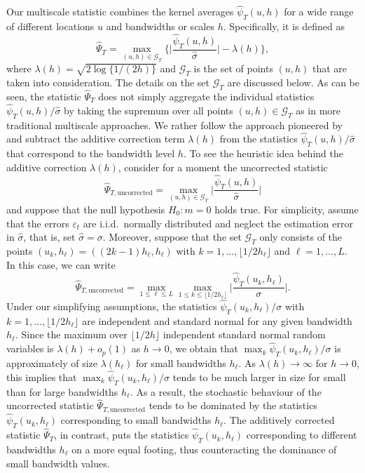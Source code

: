 Our multiscale statistic combines the kernel averages $\widehat{\psi}_T(u,h)$ for a wide range of different locations $u$ and bandwidths or scales $h$. Specifically, it is defined as
\begin{equation}\label{multiscale-stat}
\widehat{\Psi}_T = \max_{(u,h) \in \mathcal{G}_T} \Big\{ \Big|\frac{\widehat{\psi}_T(u,h)}{\widehat{\sigma}}\Big| - \lambda(h) \Big\}, 
\end{equation} 
where $\lambda(h) = \sqrt{2 \log \{ 1/(2h) \}}$ and $\mathcal{G}_T$ is the set of points $(u,h)$ that are taken into consideration. The details on the set $\mathcal{G}_T$ are discussed below. As can be seen, the statistic $\widehat{\Psi}_T$ does not simply aggregate the individual statistics $\widehat{\psi}_T(u,h)/\widehat{\sigma}$ by taking the supremum over all points $(u,h) \in \mathcal{G}_T$ as in more traditional multiscale approaches. We rather follow the approach pioneered by \cite{DuembgenSpokoiny2001} and subtract the additive correction term $\lambda(h)$ from the statistics $\widehat{\psi}_T(u,h)/\widehat{\sigma}$ that correspond to the bandwidth level $h$. To see the heuristic idea behind the additive correction $\lambda(h)$, consider for a moment the uncorrected statistic
\[ \widehat{\Psi}_{T,\text{uncorrected}} = \max_{(u,h) \in \mathcal{G}_T} \Big|\frac{\widehat{\psi}_T(u,h)}{\widehat{\sigma}}\Big| \]
and suppose that the null hypothesis $H_0: m = 0$ holds true. For simplicity, assume that the errors $\varepsilon_t$ are i.i.d.\ normally distributed and neglect the estimation error in $\widehat{\sigma}$, that is, set $\widehat{\sigma} = \sigma$. Moreover, suppose that the set $\mathcal{G}_T$ only consists of the points $(u_k,h_\ell) = ((2k - 1)h_\ell,h_\ell)$ with $k = 1,\ldots,\lfloor 1/2h_\ell \rfloor$ and $\ell = 1,\ldots,L$. In this case, we can write
\[ \widehat{\Psi}_{T,\text{uncorrected}} = \max_{1 \le \ell \le L} \max_{1 \le k \le \lfloor 1/2h_\ell \rfloor} \Big|\frac{\widehat{\psi}_T(u_k,h_\ell)}{\sigma}\Big|. \]
Under our simplifying assumptions, the statistics $\widehat{\psi}_T(u_k,h_\ell)/\sigma$ with $k = 1,\ldots,\lfloor 1/2h_\ell \rfloor$ are independent and standard normal for any given bandwidth $h_\ell$. Since the maximum over $\lfloor 1/2h \rfloor$ independent standard normal random variables is $\lambda(h) + o_p(1)$ as $h \rightarrow 0$, we obtain that $\max_{k} \widehat{\psi}_T(u_k,h_\ell)/\sigma$ is approximately of size $\lambda(h_\ell)$ for small bandwidths $h_\ell$. As $\lambda(h) \rightarrow \infty$ for $h \rightarrow 0$, this implies that $\max_{k} \widehat{\psi}_T(u_k,h_\ell)/\sigma$ tends to be much larger in size for small than for large bandwidths $h_\ell$. As a result, the stochastic behaviour of the uncorrected statistic $\widehat{\Psi}_{T,\text{uncorrected}}$ tends to be dominated by the statistics $\widehat{\psi}_T(u_k,h_\ell)$ corresponding to small bandwidths $h_\ell$. The additively corrected statistic $\widehat{\Psi}_T$, in contrast, puts the statistics $\widehat{\psi}_T(u_k,h_\ell)$ corresponding to different bandwidths $h_\ell$ on a more equal footing, thus counteracting the dominance of small bandwidth values. 


